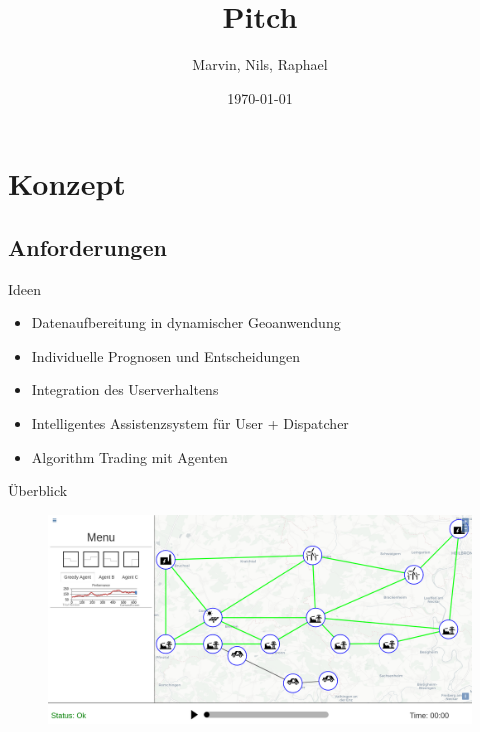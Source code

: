 \documentclass[22pt]{beamer}
\begin{document}


\date{\today}


\title[#enBW24Hack]{Pitch}

\author{Marvin, Nils, Raphael}


\begin{frame}

  \titlepage
	
\end{frame}




\section{Konzept}
\subsection{Anforderungen}
    \begin{frame}{Ideen}
    \begin{itemize}
        \item<1-> Datenaufbereitung in dynamischer Geoanwendung
        \item<2-> Individuelle Prognosen und Entscheidungen
        \item<3-> Integration des Userverhaltens
        \item<4-> Intelligentes Assistenzsystem für User + Dispatcher
        \item<5-> Algorithm Trading mit Agenten
    \end{itemize}
    \end{frame}



  \begin{frame}{Überblick}
    \begin{figure}[!h]
      \centering
      \includegraphics[width=115mm]{resources/overview.png}
      \label{fig:overview}
    \end{figure}
	\end{frame}
\end{document}
